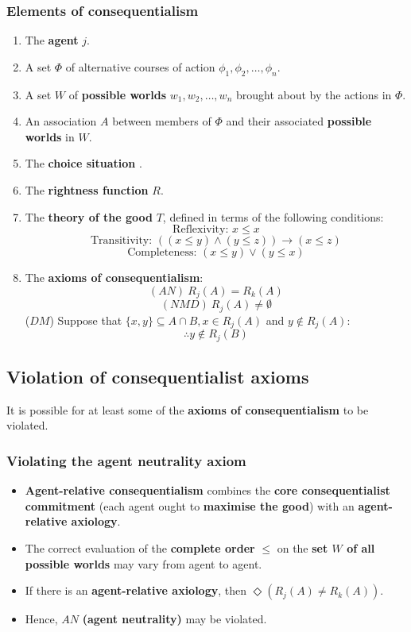 \documentclass[11pt]{article}
\begin{document}
 \newpage
\subsubsection{Elements of consequentialism}
\label{sec:orgd224836}
\begin{enumerate}
\item The \textbf{agent} \(j\).
\item A set \(\Phi\) of alternative courses of action \(\phi_1, \phi_2, \ldots, \phi_n\).
\item A set \(W\) of \textbf{possible worlds} \(w_1, w_2, \ldots, w_n\) brought about by the actions in \(\Phi\).
\item An association \(A\) between members of \(\Phi\) and their associated \textbf{possible worlds} in \(W\).
\item The \textbf{choice situation} \(<j, A>\).
\item The \textbf{rightness function} \(R\).
\item The \textbf{theory of the good} \(T\), defined in terms of the following conditions:
\[\text{Reflexivity: } x \le x\]
\[\text{Transitivity: } ((x \le y) \wedge (y \le z)) \rightarrow (x \le z)\]
\[\text{Completeness: } (x \le y) \vee (y \le x)\]
\item The \textbf{axioms of consequentialism}:
\[(AN) \ R_j(A) = R_k (A)\]
\[(NMD) \ R_j(A) \ne \emptyset\]
(\(DM\)) Suppose that \(\{x, y\} \subseteq A \cap B, x \in R_j (A)\) and \(y \notin R_j (A)\):
\[\therefore y \notin R_j (B)\]
\end{enumerate}

 \newpage
\subsection{Violation of consequentialist axioms}
\label{sec:org3db930e}
It is possible for at least some of the \textbf{axioms of consequentialism} to be violated.
\subsubsection{Violating the agent neutrality axiom}
\label{sec:org1f16690}
\begin{itemize}
\item \textbf{Agent-relative consequentialism} combines the \textbf{core consequentialist commitment} (each agent ought to \textbf{maximise the good}) with an \textbf{agent-relative axiology}.
\item The correct evaluation of the \textbf{complete order} \(\le\) on the \textbf{set \(W\) of all possible worlds} may vary from agent to agent.
\item If there is an \textbf{agent-relative axiology}, then \(\Diamond (R_j (A) \ne R_k (A))\).
\item Hence, \(AN\) \textbf{(agent neutrality)} may be violated.
\end{itemize}
\end{document}
